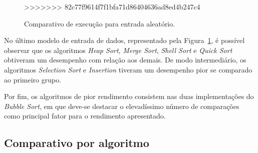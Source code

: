 \documentclass[conference]{IEEEtran}
\begin{document}
\begin{figure}

\centering
>>>>>>> 82c77f9614f7f1bfa71d86404636ad8ed4b247c4

\caption{Comparativo de execução para entrada aleatório.}
\label{image: aleatoria}
\end{figure}

No último modelo de entrada de dados, representado pela Figura~\ref{image: aleatoria}, é possível observar que os algoritmos \textit{Heap Sort}, \textit{Merge Sort}, \textit{Shell Sort} e \textit{Quick Sort} obtiveram um desempenho com relação aos demais. De modo intermediário, os algoritmos \textit{Selection Sort} e \textit{Insertion} tiveram um desempenho pior se comparado ao primeiro grupo. 

Por fim, os algoritmos de pior rendimento consistem nas duas implementações do \textit{Bubble Sort}, em que deve-se destacar o elevadíssimo número de comparações como principal fator para o rendimento apresentado.


\subsection{Comparativo por algoritmo}
~\\
\end{document}
